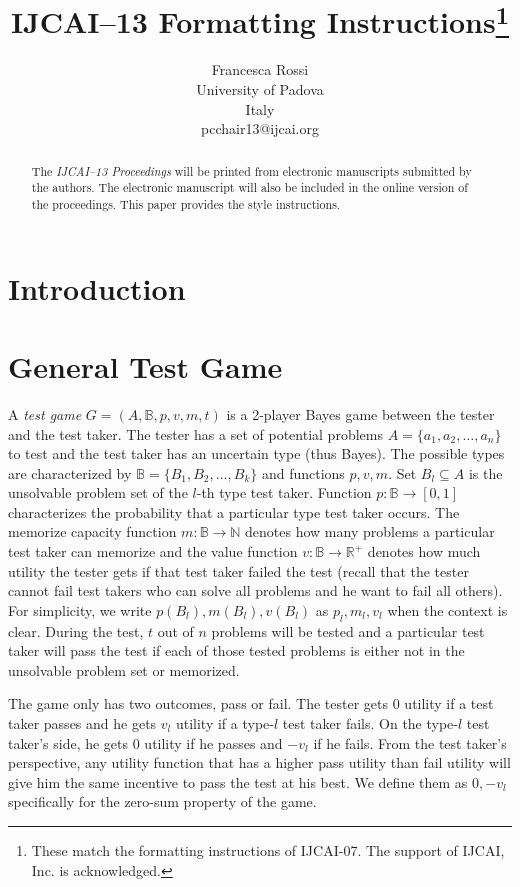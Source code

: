 \documentclass{article}
\title{IJCAI--13 Formatting Instructions\thanks{These match the formatting instructions of IJCAI-07. The support of IJCAI, Inc. is acknowledged.}}
\author{Francesca Rossi \\
University of Padova\\
Italy \\
pcchair13@ijcai.org}
\begin{document}
\maketitle

\begin{abstract}
  The {\it IJCAI--13 Proceedings} will be printed from electronic
  manuscripts submitted by the authors. The electronic manuscript will
  also be included in the online version of the proceedings. This paper
  provides the style instructions.
\end{abstract}

\section{Introduction}

\section{General Test Game}

A \emph{test game} $G = (A, \mathbb B, p, v, m, t)$ is a 2-player Bayes game
between the tester and the test taker. The tester has a set of potential
problems $A = \{a_1, a_2, \ldots, a_n\}$ to test and the test taker has an
uncertain type (thus Bayes). The possible types are characterized by $\mathbb B
= \{B_1, B_2, \ldots, B_k\}$ and functions $p, v, m$. Set $B_l \subseteq A$ is
the unsolvable problem set of the $l$-th type test taker.  Function $p: \mathbb
B \rightarrow [0,1]$ characterizes the probability that a particular type test
taker occurs.  The memorize capacity function $m: \mathbb B \rightarrow \mathbb
N$ denotes how many problems a particular test taker can memorize and the value
function $v: \mathbb B \rightarrow \mathbb R^+$ denotes how much utility the
tester gets if that test taker failed the test (recall that the tester cannot
fail test takers who can solve all problems and he want to fail all others).
For simplicity, we write $p(B_l), m(B_l), v(B_l)$ as $p_l, m_l, v_l$ when the
context is clear.  During the test, $t$ out of $n$ problems will be tested and
a particular test taker will pass the test if each of those tested problems is
either not in the unsolvable problem set or memorized.  

The game only has two outcomes, pass or fail. The tester gets $0$ utility if a
test taker passes and he gets $v_l$ utility if a type-$l$ test taker fails. On
the type-$l$ test taker's side, he gets $0$ utility if he passes and $-v_l$ if
he fails. From the test taker's perspective, any utility function that has a
higher pass utility than fail utility will give him the same incentive to pass
the test at his best. We define them as $0, -v_l$ specifically for the zero-sum
property of the game.
\end{document}
